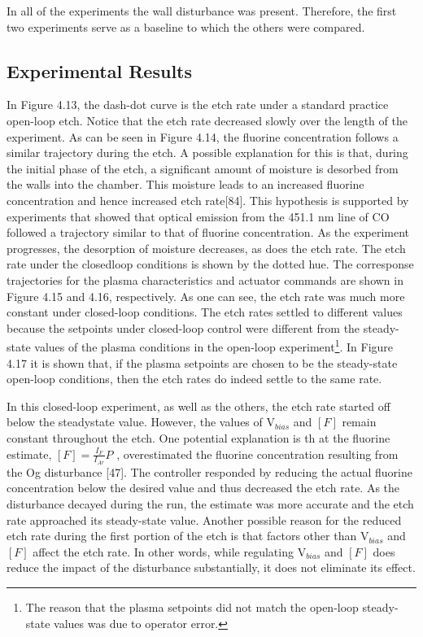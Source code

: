 \noindent In all of the experiments the wall disturbance was present. Therefore, the first two experiments serve as a baseline to which the others were compared.

\subsection{Experimental Results}

\tab In Figure 4.13, the dash-dot curve is the etch rate under a standard practice open-loop
etch. Notice that the etch rate decreased slowly over the length of the experiment. As
can be seen in Figure 4.14, the fluorine concentration follows a similar trajectory during the etch. A possible explanation for this is that, during the initial phase of the etch, a significant amount of moisture is desorbed from the walls into the chamber. This moisture leads to an increased fluorine concentration and hence increased etch rate[84]. This hypothesis is supported by experiments that showed that optical emission from the 451.1 nm line of CO
followed a trajectory similar to that of fluorine concentration. As the experiment progresses, the desorption of moisture decreases, as does the etch rate. The etch rate under the closedloop conditions is shown by the dotted hue. The corresponse trajectories for the plasma characteristics and actuator commands are shown in Figure 4.15 and 4.16, respectively. As one can see, the etch rate was much more constant under closed-loop conditions. The etch rates settled to different values because the setpoints under closed-loop control were different from the steady-state values of the plasma conditions in the open-loop experiment\footnote{The reason that the plasma setpoints did not match the open-loop steady-state values was due to operator error.}. In Figure 4.17 it is shown that, if the plasma setpoints are chosen to be the steady-state open-loop conditions, then the etch rates do indeed settle to the same rate. 

In this closed-loop experiment, as well as the others, the etch rate started off below the steadystate value. However, the values of $\text{V}_{bias}$ and $[F]$ remain constant throughout the etch. One potential explanation is th at the fluorine estimate, $[F]=\frac{I_{F}}{I_{Ar}}P$ , overestimated the fluorine concentration resulting from the Og disturbance [47]. The controller responded by reducing the actual fluorine concentration below the desired value and thus decreased the etch rate. As the disturbance decayed during the run, the estimate was more accurate and the etch rate approached its steady-state value. Another possible reason for the reduced etch rate during the first portion of the etch is that factors other than $\text{V}_{bias}$ and $[F]$ affect the etch rate. In other words, while regulating $\text{V}_{bias}$ and $[F]$ does reduce the impact of the disturbance substantially, it does not eliminate its effect.


